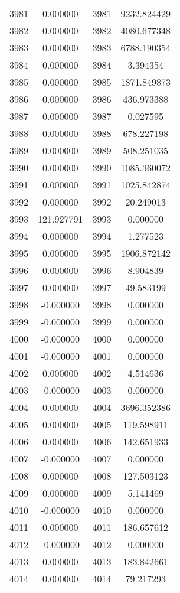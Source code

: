 \documentclass[12pt]{article}
\begin{document}
\begin{longtable}{@{}cccc@{}}
3981 & 0.000000 & 3981 & 9232.824429 \\
3982 & 0.000000 & 3982 & 4080.677348 \\
3983 & 0.000000 & 3983 & 6788.190354 \\
3984 & 0.000000 & 3984 & 3.394354 \\
3985 & 0.000000 & 3985 & 1871.849873 \\
3986 & 0.000000 & 3986 & 436.973388 \\
3987 & 0.000000 & 3987 & 0.027595 \\
3988 & 0.000000 & 3988 & 678.227198 \\
3989 & 0.000000 & 3989 & 508.251035 \\
3990 & 0.000000 & 3990 & 1085.360072 \\
3991 & 0.000000 & 3991 & 1025.842874 \\
3992 & 0.000000 & 3992 & 20.249013 \\
3993 & 121.927791 & 3993 & 0.000000 \\
3994 & 0.000000 & 3994 & 1.277523 \\
3995 & 0.000000 & 3995 & 1906.872142 \\
3996 & 0.000000 & 3996 & 8.904839 \\
3997 & 0.000000 & 3997 & 49.583199 \\
3998 & -0.000000 & 3998 & 0.000000 \\
3999 & -0.000000 & 3999 & 0.000000 \\
4000 & -0.000000 & 4000 & 0.000000 \\
4001 & -0.000000 & 4001 & 0.000000 \\
4002 & 0.000000 & 4002 & 4.514636 \\
4003 & -0.000000 & 4003 & 0.000000 \\
4004 & 0.000000 & 4004 & 3696.352386 \\
4005 & 0.000000 & 4005 & 119.598911 \\
4006 & 0.000000 & 4006 & 142.651933 \\
4007 & -0.000000 & 4007 & 0.000000 \\
4008 & 0.000000 & 4008 & 127.503123 \\
4009 & 0.000000 & 4009 & 5.141469 \\
4010 & -0.000000 & 4010 & 0.000000 \\
4011 & 0.000000 & 4011 & 186.657612 \\
4012 & -0.000000 & 4012 & 0.000000 \\
4013 & 0.000000 & 4013 & 183.842661 \\
4014 & 0.000000 & 4014 & 79.217293 \\

\end{longtable}
\end{document}
